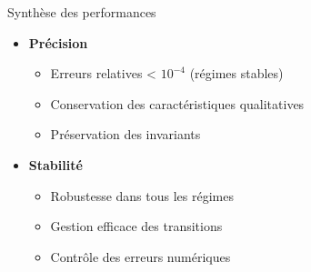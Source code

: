 \begin{frame}{Synthèse des performances}
    \begin{itemize}
        \item \textbf{Précision}
        \begin{itemize}
            \item Erreurs relatives < $10^{-4}$ (régimes stables)
            \item Conservation des caractéristiques qualitatives
            \item Préservation des invariants
        \end{itemize}
        \vspace{0.3cm}
        \item \textbf{Stabilité}
        \begin{itemize}
            \item Robustesse dans tous les régimes
            \item Gestion efficace des transitions
            \item Contrôle des erreurs numériques
        \end{itemize}
    \end{itemize}
\end{frame}